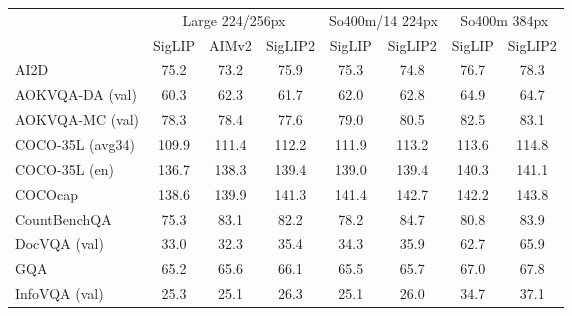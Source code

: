 \begin{tabular}{lccccccc}
\toprule
 & \multicolumn{3}{c}{Large 224/256px} & \multicolumn{2}{c}{So400m/14 224px} & \multicolumn{2}{c}{So400m 384px} \\
\cmidrule(lr){2-4} \cmidrule(lr){5-6} \cmidrule(lr){7-8}
\rule{0pt}{10pt}
 & SigLIP & AIMv2 & SigLIP2 & SigLIP & SigLIP2 & SigLIP & SigLIP2 \\
\midrule


AI2D & \phantom{-}\phantom{0}75.2 & \phantom{-}\phantom{0}73.2 & \phantom{-}\phantom{0}75.9 & \phantom{-}\phantom{0}75.3 & \phantom{-}\phantom{0}74.8 & \phantom{-}\phantom{0}76.7 & \phantom{-}\phantom{0}78.3 \\
AOKVQA-DA (val) & \phantom{-}\phantom{0}60.3 & \phantom{-}\phantom{0}62.3 & \phantom{-}\phantom{0}61.7 & \phantom{-}\phantom{0}62.0 & \phantom{-}\phantom{0}62.8 & \phantom{-}\phantom{0}64.9 & \phantom{-}\phantom{0}64.7 \\
AOKVQA-MC (val) & \phantom{-}\phantom{0}78.3 & \phantom{-}\phantom{0}78.4 & \phantom{-}\phantom{0}77.6 & \phantom{-}\phantom{0}79.0 & \phantom{-}\phantom{0}80.5 & \phantom{-}\phantom{0}82.5 & \phantom{-}\phantom{0}83.1 \\
COCO-35L (avg34) & \phantom{-}109.9 & \phantom{-}111.4 & \phantom{-}112.2 & \phantom{-}111.9 & \phantom{-}113.2 & \phantom{-}113.6 & \phantom{-}114.8 \\
COCO-35L (en) & \phantom{-}136.7 & \phantom{-}138.3 & \phantom{-}139.4 & \phantom{-}139.0 & \phantom{-}139.4 & \phantom{-}140.3 & \phantom{-}141.1 \\
COCOcap & \phantom{-}138.6 & \phantom{-}139.9 & \phantom{-}141.3 & \phantom{-}141.4 & \phantom{-}142.7 & \phantom{-}142.2 & \phantom{-}143.8 \\
CountBenchQA & \phantom{-}\phantom{0}75.3 & \phantom{-}\phantom{0}83.1 & \phantom{-}\phantom{0}82.2 & \phantom{-}\phantom{0}78.2 & \phantom{-}\phantom{0}84.7 & \phantom{-}\phantom{0}80.8 & \phantom{-}\phantom{0}83.9 \\
DocVQA (val) & \phantom{-}\phantom{0}33.0 & \phantom{-}\phantom{0}32.3 & \phantom{-}\phantom{0}35.4 & \phantom{-}\phantom{0}34.3 & \phantom{-}\phantom{0}35.9 & \phantom{-}\phantom{0}62.7 & \phantom{-}\phantom{0}65.9 \\
GQA & \phantom{-}\phantom{0}65.2 & \phantom{-}\phantom{0}65.6 & \phantom{-}\phantom{0}66.1 & \phantom{-}\phantom{0}65.5 & \phantom{-}\phantom{0}65.7 & \phantom{-}\phantom{0}67.0 & \phantom{-}\phantom{0}67.8 \\
InfoVQA (val) & \phantom{-}\phantom{0}25.3 & \phantom{-}\phantom{0}25.1 & \phantom{-}\phantom{0}26.3 & \phantom{-}\phantom{0}25.1 & \phantom{-}\phantom{0}26.0 & \phantom{-}\phantom{0}34.7 & \phantom{-}\phantom{0}37.1 \\

\end{tabular}
